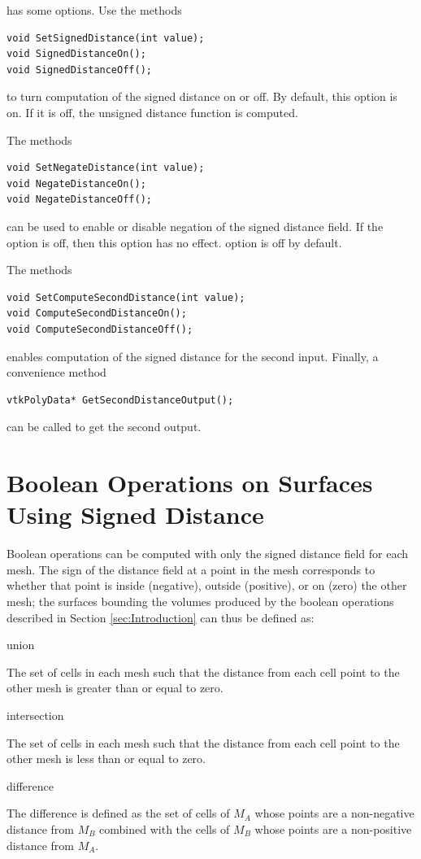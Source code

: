 \documentclass{InsightArticle}
\begin{document}
 has some options. Use the methods
\begin{verbatim}
void SetSignedDistance(int value);
void SignedDistanceOn();
void SignedDistanceOff();
\end{verbatim}
to turn computation of the signed distance on or off. By default, this option is on. If it is off, the unsigned distance function is computed.

The methods
\begin{verbatim}
void SetNegateDistance(int value);
void NegateDistanceOn();
void NegateDistanceOff();
\end{verbatim}
can be used to enable or disable negation of the signed distance field. If the  option is off, then this option has no effect.  option is off by default.

The methods
\begin{verbatim}
void SetComputeSecondDistance(int value);
void ComputeSecondDistanceOn();
void ComputeSecondDistanceOff();
\end{verbatim}
enables computation of the signed distance for the second input. Finally, a convenience method
\begin{verbatim}
vtkPolyData* GetSecondDistanceOutput();
\end{verbatim}
can be called to get the second output.

\section{Boolean Operations on Surfaces Using Signed Distance}

Boolean operations can be computed with only the signed distance field for each mesh. The sign of the distance field at a point in the mesh corresponds to whether that point is inside (negative), outside (positive), or on (zero) the other mesh; the surfaces bounding the volumes produced by the boolean operations described in Section \ref{sec:Introduction} can thus be defined as:

\begin{description}

\item union

The set of cells in each mesh such that the distance from each cell point to the other mesh is greater than or equal to zero.

\item intersection

The set of cells in each mesh such that the distance from each cell point to the other mesh is less than or equal to zero.

\item difference

The difference is defined as the set of cells of $M_A$ whose points are a non-negative distance from $M_B$ combined with the cells of $M_B$ whose points are a non-positive distance from $M_A$.

\end{description}
\end{document}
